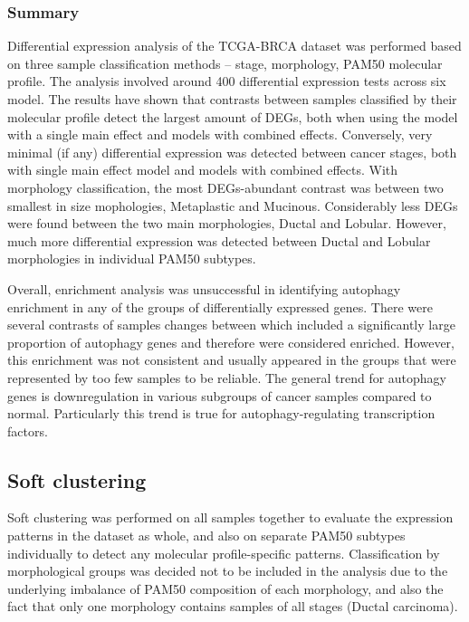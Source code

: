         \subsubsection{Summary}
        
        Differential expression analysis of the TCGA-BRCA dataset was performed based on three sample classification methods -- stage, morphology, PAM50 molecular profile. The analysis involved around 400 differential expression tests across six model. The results have shown that contrasts between samples classified by their molecular profile detect the largest amount of DEGs, both when using the model with a single main effect and models with combined effects. Conversely, very minimal (if any) differential expression was detected between cancer stages, both with single main effect model and models with combined effects. With morphology classification, the most DEGs-abundant contrast was between two smallest in size mophologies, Metaplastic and Mucinous. Considerably less DEGs were found between the two main morphologies, Ductal and Lobular. However, much more differential expression was detected between Ductal and Lobular morphologies in individual PAM50 subtypes. 
        
        Overall, enrichment analysis was unsuccessful in identifying autophagy enrichment in any of the groups of differentially expressed genes. There were several contrasts of samples changes between which included a significantly large proportion of autophagy genes and therefore were considered enriched. However, this enrichment was not consistent and usually appeared in the groups that were represented by too few samples to be reliable. The general trend for autophagy genes is downregulation in various subgroups of cancer samples compared to normal. Particularly this trend is true for autophagy-regulating transcription factors. 
        
        
        
        
        
        
        

\newpage
    \subsection{Soft clustering}
    Soft clustering was performed on all samples together to evaluate the expression patterns in the dataset as whole, and also on separate PAM50 subtypes individually to detect any molecular profile-specific patterns. Classification by morphological groups was decided not to be included in the analysis due to the underlying imbalance of PAM50 composition of each morphology, and also the fact that only one morphology contains samples of all stages (Ductal carcinoma). 

